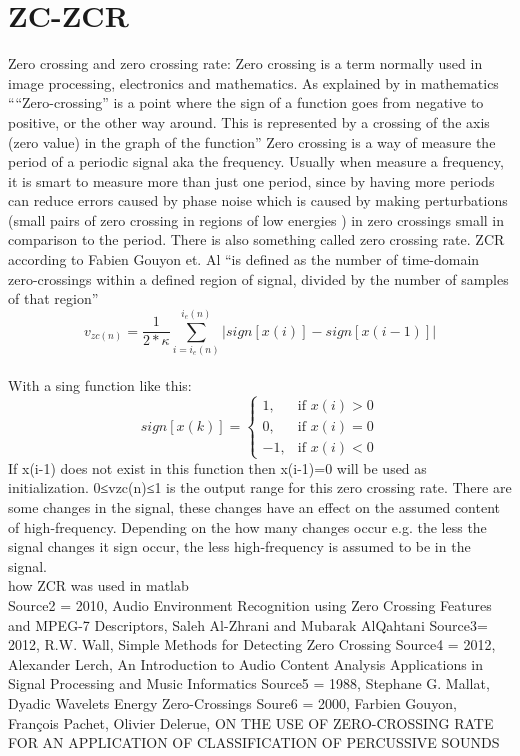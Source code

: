 \section{ZC-ZCR}

Zero crossing and zero crossing rate:
Zero crossing is a term normally used in image processing, electronics and mathematics. As explained by \cite{Al-Zhrani2010}  in mathematics ““Zero-crossing” is a point where the sign of a function goes from negative to positive, or the other way around. This is represented by a crossing of the axis (zero value) in the graph of the function” \cite{Al-Zhrani2010}
Zero crossing is a way of measure the period of a periodic signal aka the frequency.\cite{RWW2012}  Usually when measure a frequency, it is smart to measure more than just one period, since by having more periods can reduce errors caused by phase noise which is caused by making perturbations (small pairs of zero crossing in regions of low energies \cite{Mallat1988} ) in zero crossings small in comparison to the period. \cite{RWW2012}
There is also something called zero crossing rate. ZCR according to Fabien Gouyon et. Al “is defined as the number of time-domain zero-crossings within a defined region of signal, divided by the number of samples of that region” \cite{Gouyon2000}
\\
\begin{equation}\label{eq:ZCR}
v_{zc(n)}= \frac{1}{2* \kappa}\sum_{i=i_e(n)}^{i_e (n)}|sign[x(i)]-sign[x(i-1)]|
\end{equation}
\\
With a sing function like this:
\begin{equation}
sign[x(k)]=
\begin{cases}
 1, & \text{if } x(i)>0\\ 
 0, & \text{if } x(i)=0\\
-1, & \text{if } x(i)<0
\end{cases}
\end{equation}
If x(i-1) does not exist in this function then x(i-1)=0 will be used as initialization. 
0≤vzc(n)≤1 is the output range for this zero crossing rate. There are some changes in the signal, these changes have an effect on the assumed content of high-frequency. Depending on the how many changes occur e.g. the less the signal changes it sign occur, the less high-frequency is assumed to be in the signal. \cite{Al-Zhrani2010} 
\\
how ZCR was used in matlab
\\
Source2 = 2010, Audio Environment Recognition using Zero Crossing Features and MPEG-7 Descriptors, Saleh Al-Zhrani and Mubarak AlQahtani
Source3= 2012, R.W. Wall, Simple Methods for Detecting Zero Crossing 
Source4 = 2012, Alexander Lerch, An Introduction to Audio Content Analysis Applications in Signal Processing and Music Informatics
Source5 = 1988, Stephane G. Mallat, Dyadic Wavelets Energy Zero-Crossings
Soure6 = 2000, Farbien Gouyon, François Pachet, Olivier Delerue, ON THE USE OF ZERO-CROSSING RATE FOR AN APPLICATION OF CLASSIFICATION OF PERCUSSIVE SOUNDS  